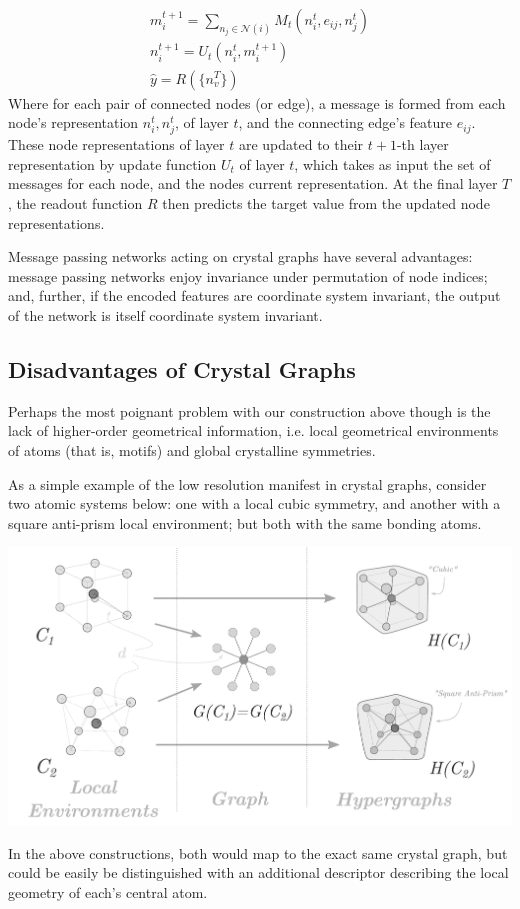 \documentclass[10pt,a4paper]{article}
\begin{document}
\begin{gather*}
m_i^{t+1}=\sum_{n_j\in \mathcal{N}(i)} M_t(n_i^{t},e_{ij},n_j^t )\\
n_i^{t+1}=U_t(n_i^t,m_i^{t+1})\\
\hat{y}=R(\lbrace n_v^T\rbrace)
\end{gather*}
Where for each pair of connected nodes (or edge), a message is formed from each node's representation $n_i^t,n_j^t$, of layer $t$, and the connecting edge's feature $e_{ij}$. These  node representations of layer $t$ are updated to their $t+1$-th layer representation by update function $U_t$ of layer $t$, which takes as input the set of messages for each node, and the nodes current representation. At the final layer $T$, the readout function $R$ then predicts the target value from the updated node representations.


Message passing networks acting on crystal graphs have several advantages: message passing networks enjoy invariance under permutation of node indices; and, further, if the encoded features are coordinate system invariant, the output of the network is itself coordinate system invariant.


\subsection{Disadvantages of Crystal Graphs}
Perhaps the most poignant problem with our construction above though is the lack of higher-order geometrical information, i.e. local geometrical environments of atoms (that is, motifs) and global crystalline symmetries.

As a simple example of the low resolution manifest in crystal graphs, consider two atomic systems below: one with a local cubic symmetry, and another with a square anti-prism local environment; but both with the same bonding atoms. 
\begin{center}
\includegraphics[scale=0.63]{graph2hgraph_tall_revise.pdf}
\end{center}
In the above constructions, both would map to the exact same crystal graph, but could be easily be distinguished with an additional descriptor describing the local geometry of each's central atom.
\end{document}
